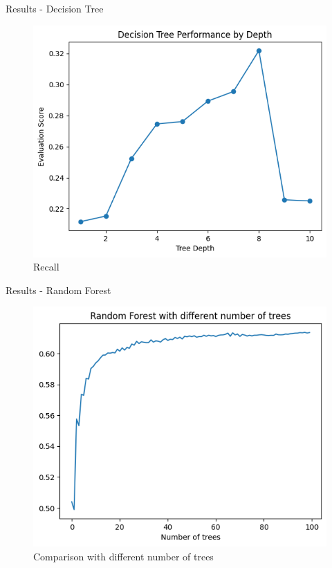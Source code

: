 \documentclass{beamer}
\begin{document}
\begin{frame}[t]{Results - Decision Tree}
\begin{figure}[h]
\begin{minipage}{0.3\textwidth}
		\includegraphics[width=\linewidth]{images/DecisionTree/recall.png}
		\caption{Recall}
	\end{minipage}
\end{figure}
\end{frame}

\begin{frame}[t]{Results - Random Forest}
	\vspace{-3mm}
	\begin{figure}[h]
		\caption{Comparison with different number of trees}
		\centering
		\includegraphics[width=0.73\linewidth]{images/RandomForest/compare_n_trees.png}
	\end{figure}
\end{frame}
\end{document}
